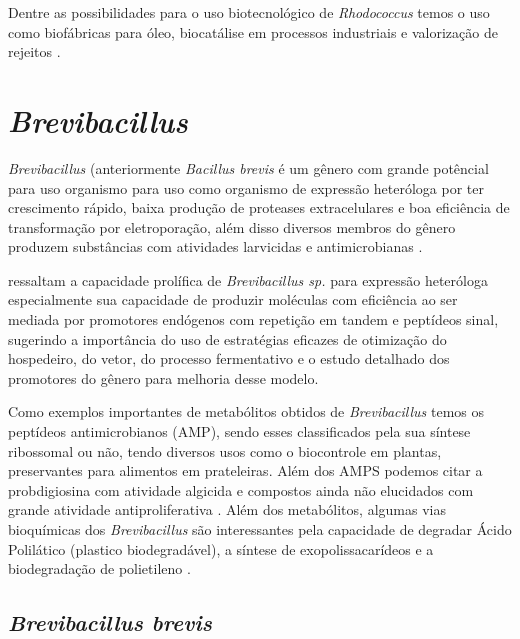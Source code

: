 Dentre as possibilidades para o uso biotecnológico de \textit{Rhodococcus} temos o uso como biofábricas 
para óleo, biocatálise em processos industriais e valorização de rejeitos \cite{alvarez2021,krivoruchko2019,anthony2019,chatterjee2020}.

\section{\textit{Brevibacillus}}
\textit{Brevibacillus} (anteriormente \textit{Bacillus brevis} é um gênero com grande potêncial para uso organismo para uso como organismo de expressão heteróloga
por ter crescimento rápido, baixa produção de proteases extracelulares e boa eficiência de transformação
por eletroporação, além disso diversos membros do gênero produzem substâncias com atividades 
larvicidas e antimicrobianas  \cite{panda2014brevibacillus}.  

 ressaltam a capacidade prolífica de \textit{Brevibacillus sp.} para expressão heteróloga
especialmente sua capacidade de produzir moléculas com eficiência ao ser mediada por promotores endógenos
com repetição em tandem e peptídeos sinal, sugerindo a importância do uso de estratégias eficazes de otimização do hospedeiro, do vetor,
do processo fermentativo e o estudo detalhado dos promotores do gênero para melhoria desse modelo.

Como exemplos importantes de metabólitos obtidos de \textit{Brevibacillus} temos os peptídeos antimicrobianos (AMP),
sendo esses classificados pela sua síntese ribossomal ou não, tendo diversos usos como o biocontrole em plantas, preservantes
para alimentos em prateleiras\cite{yang2018antimicrobial}. Além dos AMPS podemos citar a probdigiosina com atividade algicida e compostos ainda não
elucidados com grande atividade antiproliferativa \cite{zhang2022transcriptome,arumugam2018isolation}.
Além dos metabólitos, algumas vias bioquímicas dos \textit{Brevibacillus} são interessantes pela capacidade de
degradar Ácido Polilático (plastico biodegradável), a síntese de exopolissacarídeos e a 
biodegradação de polietileno \cite{yu2022comparison,yildiz2015genomic,hadad2005biodegradation,ali2022screening}.

\subsection{\textit{Brevibacillus brevis}}


